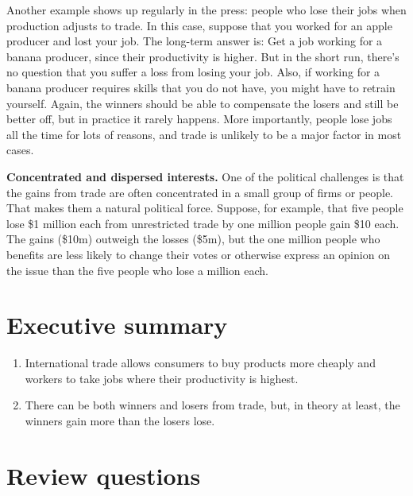 Another example shows up regularly in the press: people who lose their
jobs when production adjusts to trade.  In this case, suppose that you
worked for an apple producer and lost your job. The long-term
answer is:  Get a job working for a banana producer, since their
productivity is higher. But in the short run, there's no question
that you suffer a loss from losing your job. Also, if working for a
banana producer requires skills that you do not have, you might
have to retrain yourself. Again, the winners should be able to
compensate the losers and still be better off, but in practice it
rarely happens. More importantly, people lose jobs all the time for lots of
reasons, and trade is unlikely to be a major factor in most cases.


{\bf Concentrated and dispersed interests.}
One of the political challenges is that the gains from trade
are often concentrated in a small group of firms or people.
That makes them a natural political force.
Suppose, for example, that five people lose \$1 million each from
unrestricted trade by one million people gain \$10 each.
The gains (\$10m) outweigh the losses (\$5m),
but the one million people who benefits are less likely to change their votes
or otherwise express an opinion on the issue than the five people
who lose a million each.


\section*{Executive summary}

\setlength{\leftmargini}{0.5\oldleftmargini}
\begin{enumerate}
\item International trade allows consumers to buy products more cheaply
and workers to take jobs where their productivity is highest.

\item There can be both winners and losers from trade,
but, in theory at least, the winners gain more than the losers lose.
\end{enumerate}
\setlength{\leftmargini}{\oldleftmargini}

\section*{Review questions}

